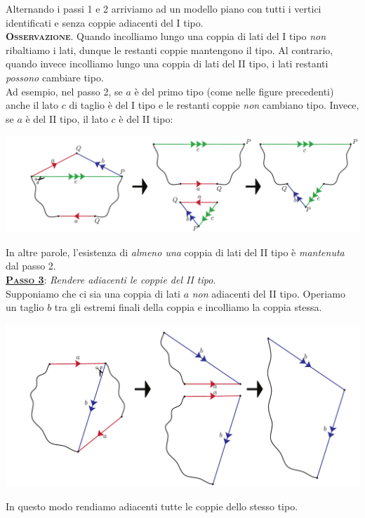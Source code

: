 \begin{demonstration}
Alternando i passi 1 e 2 arriviamo ad un modello piano con tutti i vertici identificati e senza coppie adiacenti del I tipo.\\
\textsc{\textbf{Osservazione}}. Quando incolliamo lungo una coppia di lati del I tipo \textit{non} ribaltiamo i lati, dunque le restanti coppie mantengono il tipo. Al contrario, quando invece incolliamo lungo una coppia di lati del II tipo, i lati restanti \textit{possono} cambiare tipo.\\
	Ad esempio, nel passo 2, se $a$ è del primo tipo (come nelle figure precedenti) anche il lato $c$ di taglio è del I tipo e le restanti coppie \textit{non} cambiano tipo. Invece, se $a$ è del II tipo, il lato $c$ è del II tipo:
	\begin{center}
		\includegraphics[trim=0cm 0cm 0cm 0cm, clip, scale=0.35]{images/cutandpastealgorithmstep2-3.pdf}
	\end{center}
In altre parole, l'esistenza di \textit{almeno una} coppia di lati del II tipo è \textit{mantenuta} dal passo 2.\\
\textsc{\underline{\textbf{Passo 3}}}: \textit{Rendere adiacenti le coppie del II tipo}.\\
Supponiamo che ci sia una coppia di lati $a$ \textit{non} adiacenti del II tipo. Operiamo un taglio $b$ tra gli estremi finali della coppia e incolliamo la coppia stessa.
	\begin{center}
	\includegraphics[trim=0cm 0cm 0cm 0cm, clip, scale=0.35]{images/cutandpastealgorithmstep3.pdf}
\end{center}
In questo modo rendiamo adiacenti tutte le coppie dello stesso tipo.\\

\end{demonstration}
